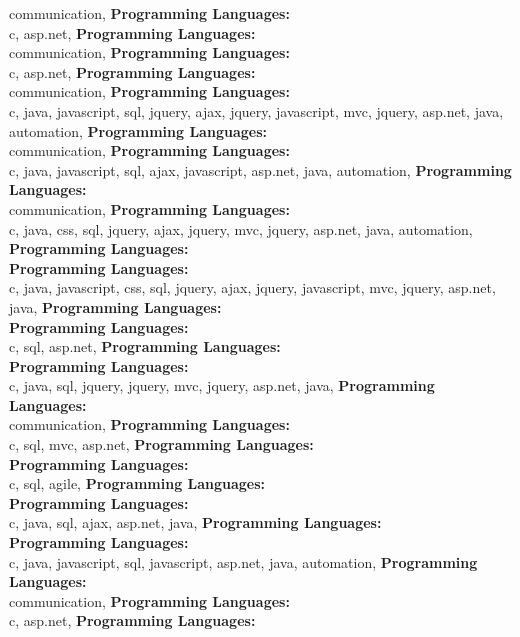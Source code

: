 communication, \textbf{Programming Languages:} \\
c, asp.net, \textbf{Programming Languages:} \\
communication, \textbf{Programming Languages:} \\
c, asp.net, \textbf{Programming Languages:} \\
communication, \textbf{Programming Languages:} \\
c, java, javascript, sql, jquery, ajax,  jquery, javascript, mvc, jquery, asp.net, java, automation, \textbf{Programming Languages:} \\
communication, \textbf{Programming Languages:} \\
c, java, javascript, sql, ajax, javascript, asp.net, java, automation, \textbf{Programming Languages:} \\
communication, \textbf{Programming Languages:} \\
c, java, css, sql, jquery, ajax,  jquery, mvc, jquery, asp.net, java, automation, \textbf{Programming Languages:} \\
\textbf{Programming Languages:} \\
c, java, javascript, css, sql, jquery, ajax,  jquery, javascript, mvc, jquery, asp.net, java, \textbf{Programming Languages:} \\
\textbf{Programming Languages:} \\
c, sql, asp.net, \textbf{Programming Languages:} \\
\textbf{Programming Languages:} \\
c, java, sql, jquery,  jquery, mvc, jquery, asp.net, java, \textbf{Programming Languages:} \\
communication, \textbf{Programming Languages:} \\
c, sql, mvc, asp.net, \textbf{Programming Languages:} \\
\textbf{Programming Languages:} \\
c, sql, agile, \textbf{Programming Languages:} \\
\textbf{Programming Languages:} \\
c, java, sql, ajax, asp.net, java, \textbf{Programming Languages:} \\
\textbf{Programming Languages:} \\
c, java, javascript, sql, javascript, asp.net, java, automation, \textbf{Programming Languages:} \\
communication, \textbf{Programming Languages:} \\
c, asp.net, \textbf{Programming Languages:} \\
